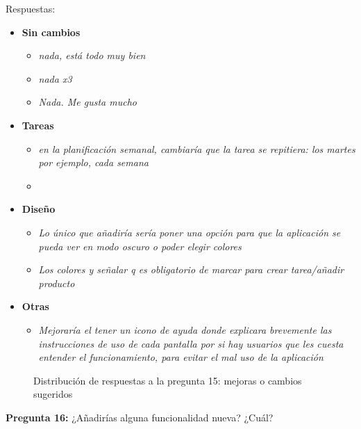 Respuestas:
\begin{itemize}
    \item \textbf{Sin cambios}
    \begin{itemize}
        \item \textit{nada, está todo muy bien}
        \item \textit{nada x3}
        \item \textit{Nada. Me gusta mucho}
    \end{itemize}
    \item \textbf{Tareas}
    \begin{itemize}
        \item \textit{en la planificación semanal, cambiaría que la tarea se repitiera: los martes por ejemplo, cada semana}
        \item 
    \end{itemize}
    \item \textbf{Diseño}
    \begin{itemize}
        \item \textit{Lo único que añadiría sería poner una opción para que la aplicación se pueda ver en modo oscuro o poder elegir colores}
        \item \textit{Los colores y señalar q es obligatorio de marcar para crear tarea/añadir producto}
    \end{itemize}
    \item \textbf{Otras}
    \begin{itemize}
        \item \textit{Mejoraría el tener un icono de ayuda donde explicara brevemente las instrucciones de uso de cada pantalla por si hay usuarios que les cuesta entender el funcionamiento, para evitar el mal uso de la aplicación}
    \end{itemize}
\end{itemize}

\begin{figure}[H]
    \centering
    \caption{Distribución de respuestas a la pregunta 15: mejoras o cambios sugeridos}
    \label{fig:mejoras-cambios}
\end{figure}

\textbf{Pregunta 16:} ¿Añadirías alguna funcionalidad nueva? ¿Cuál?

